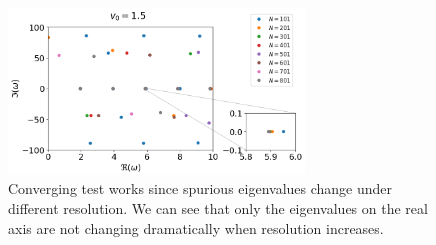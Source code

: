 \begin{figure}[htbp]
  \begin{center}
    \includegraphics[width=0.7\textwidth]{figures/convergence-test.png}
  \end{center}
  \caption{Converging test works since spurious eigenvalues change under different resolution. We can see that only the eigenvalues on the real axis are not changing dramatically when resolution increases.}
  \label{fig:converging-test}
\end{figure}


